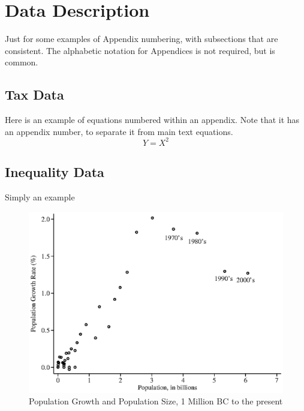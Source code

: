 \documentclass[11pt]{article}
\begin{document}
\section{Data Description}
Just for some examples of Appendix numbering, with subsections that are consistent. The alphabetic notation for Appendices is not required, but is common. 
\subsection{Tax Data}
Here is an example of equations numbered within an appendix. Note that it has an appendix number, to separate it from main text equations. 
\begin{equation}
    Y = X^2
\end{equation}
\subsection{Inequality Data}
Simply an example

\clearpage %

\begin{figure}[!htb]
\begin{center}
\caption{Population Growth and Population Size, 1 Million BC to the present}
\label{FIG_dens_rurd}
\includegraphics[width=1.0\textwidth]{figure_8_5.eps}
\end{center}
\vspace{-.5cm}
\end{figure}
\end{document}
